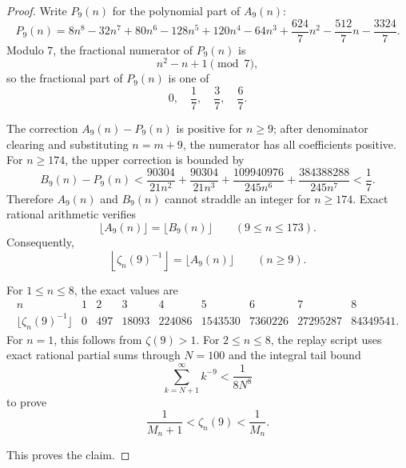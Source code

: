 \begin{proof}
Write \(P_9(n)\) for the polynomial part of \(A_9(n)\):
\[
P_9(n)=8n^8-32n^7+80n^6-128n^5+120n^4-64n^3
+\frac{624}{7}n^2-\frac{512}{7}n-\frac{3324}{7}.
\]
Modulo \(7\), the fractional numerator of \(P_9(n)\) is
\[
n^2-n+1\pmod 7,
\]
so the fractional part of \(P_9(n)\) is one of
\[
0,\quad \frac17,\quad \frac37,\quad \frac67.
\]

The correction \(A_9(n)-P_9(n)\) is positive for \(n\ge9\); after denominator clearing and substituting \(n=m+9\), the numerator has all coefficients positive. For \(n\ge174\), the upper correction is bounded by
\[
B_9(n)-P_9(n)
<
\frac{90304}{21n^2}
+\frac{90304}{21n^3}
+\frac{109940976}{245n^6}
+\frac{384388288}{245n^7}
<\frac17.
\]
Therefore \(A_9(n)\) and \(B_9(n)\) cannot straddle an integer for \(n\ge174\). Exact rational arithmetic verifies
\[
\lfloor A_9(n)\rfloor=\lfloor B_9(n)\rfloor
\qquad(9\le n\le173).
\]
Consequently,
\[
\left\lfloor\zeta_n(9)^{-1}\right\rfloor=\lfloor A_9(n)\rfloor
\qquad(n\ge9).
\]

For \(1\le n\le8\), the exact values are
\[
\begin{array}{c|rrrrrrrr}
n&1&2&3&4&5&6&7&8\\
\hline
\lfloor\zeta_n(9)^{-1}\rfloor&0&497&18093&224086&1543530&7360226&27295287&84349541.
\end{array}
\]
For \(n=1\), this follows from \(\zeta(9)>1\). For \(2\le n\le8\), the replay script uses exact rational partial sums through \(N=100\) and the integral tail bound
\[
\sum_{k=N+1}^{\infty}k^{-9}<\frac{1}{8N^8}
\]
to prove
\[
\frac1{M_n+1}<\zeta_n(9)<\frac1{M_n}.
\]

This proves the claim.
\end{proof}

